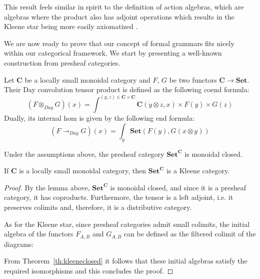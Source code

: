\documentclass[sigconf,anonymous,review,screen]{acmart}
\newcommand{\cat}[1]{\mathbf{#1}}
\newcommand{\lto}{\multimap}
\newcommand{\Set}{\mathbf{Set}}
\begin{document}
This result feels similar in spirit to the definition of action
algebras, which are algebras where the product also has adjoint
operations which results in the Kleene star being more easily
axiomatized \cite{kozen1994}.

We are now ready to prove that our concept of formal grammars fits
nicely within our categorical framework. We start by presenting a
well-known construction from presheaf categories.

\begin{definition}
  Let $\cat{C}$ be a locally small monoidal category and $F$, $G$ be
  two functors $\cat{C} \to \Set$. Their Day convolution tensor
  product is defined as the following coend formula:
  \[
  (F \otimes_{Day} G)(x) = \int^{(y,z) \in \cat{C}\times\cat{C}}\cat{C}(y\otimes z, x) \times F(y) \times G(z) 
  \]
  Dually, its internal hom is given by the following end formula:
  \[
  (F \lto_{Day} G)(x) = \int_{y} \Set(F(y), G(x \otimes y))
  \]
\end{definition}

\begin{lemma}
  Under the assumptions above, the presheaf category $\Set^{\cat{C}}$ is
  monoidal closed.
\end{lemma}

\begin{theorem}
  If $\cat{C}$ is a locally small monoidal category, then
  $\Set^{\cat{C}}$ is a Kleene category.
\end{theorem}
\begin{proof}

  By the lemma above, $\Set^{\cat{C}}$ is monoidal closed, and since it
  is a presheaf category, it has coproducts. Furthermore, the tensor
  is a left adjoint, i.e. it preserves colimits and, therefore, it is
  a distributive category.

  As for the Kleene star, since presheaf categories admit small colimits,
  the initial algebra of the functors $F_{A,B}$ and $G_{A,B}$ can be
  defined as the filtered colimit of the diagrams:

  From Theorem~\ref{th:kleeneclosed} it follows that these initial
  algebras satisfy the required isomorphisms and this concludes the
  proof.
\end{proof}
\end{document}
